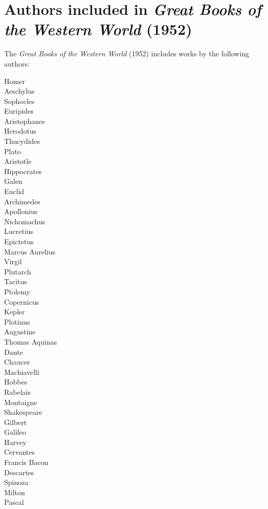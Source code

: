 \section{Authors included in \textit{Great Books of the Western World} (1952)}
The \textit{Great Books of the Western World} (1952) includes works by the following authors:
\begin{multicols}{4}
\RaggedRight Homer\\
Aeschylus\\
Sophocles\\
Euripides\\
Aristophanes\\
Herodotus\\
Thucydides\\
Plato\\
Aristotle\\
Hippocrates\\
Galen\\
Euclid\\
Archimedes\\
Apollonius\\
Nichomachus\\
Lucretius\\
Epictetus\\
Marcus Aurelius\\
Virgil\\
Plutarch\\
Tacitus\\
Ptolemy\\
Copernicus\\
Kepler\\
Plotinus\\
Augustine\\
Thomas Aquinas\\
Dante\\
Chaucer\\
Machiavelli\\
Hobbes\\
Rabelais\\
Montaigne\\
Shakespeare\\
Gilbert\\
Galileo\\
Harvey\\
Cervantes\\
Francis Bacon\\
Descartes\\
Spinoza\\
Milton\\
Pascal\\

\end{multicols}
